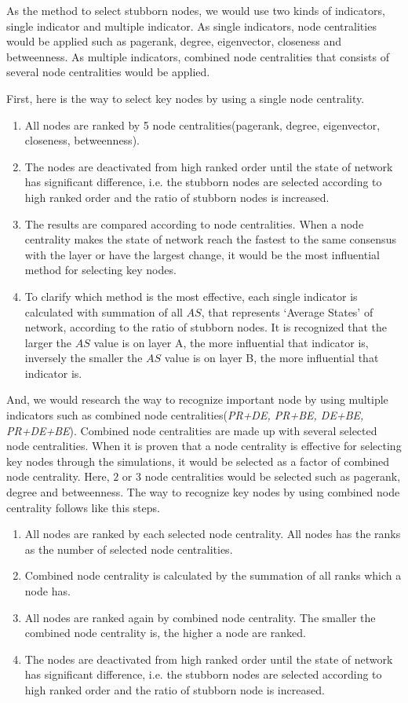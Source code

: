 As the method to select stubborn nodes, we would use two kinds of indicators, single indicator and multiple indicator. As single indicators, node centralities would be applied such as pagerank, degree, eigenvector, closeness and betweenness. As multiple indicators, combined node centralities that consists of several node centralities would be applied.
  
First, here is the way to select key nodes by using a single node centrality.
\begin{enumerate}
	\item All nodes are ranked by 5 node centralities(pagerank, degree, eigenvector, closeness, betweenness).
	\item The nodes are deactivated from high ranked order until the state of network has significant difference, i.e. the stubborn nodes are selected according to high ranked order and the ratio of stubborn nodes is increased. 
	\item The results are compared according to node centralities. When a node centrality makes the state of network reach the fastest to the same consensus with the layer or have the largest change, it would be the most influential method for selecting key nodes.
	\item To clarify which method is the most effective, each single indicator is calculated with summation of all $AS$, that represents `Average States' of network, according to the ratio of stubborn nodes. It is recognized that the larger the $AS$ value is on layer A, the more influential that indicator is, inversely the smaller the $AS$ value is on layer B, the more influential that indicator is.
	
\end{enumerate}
And, we would research the way to recognize important node by using multiple indicators such as combined node centralities(\textit{PR+DE, PR+BE, DE+BE, PR+DE+BE}). Combined node centralities are made up with several selected node centralities. When it is proven that a node centrality is effective for selecting key nodes through the simulations, it would be selected as a factor of combined node centrality. Here, $2$ or $3$ node centralities would be selected such as pagerank, degree and betweenness. 
The way to recognize key nodes by using combined node centrality follows like this steps. 
\begin{enumerate}
	\item All nodes are ranked by each selected node centrality. All nodes has the ranks as the number of selected node centralities.  
	\item Combined node centrality is calculated by the summation of all ranks which a node has. 
	\item All nodes are ranked again by combined node centrality. The smaller the combined node centrality is, the higher a node are ranked.        
	\item The nodes are deactivated from high ranked order until the state of network has significant difference, i.e. the stubborn nodes are selected according to high ranked order and the ratio of stubborn node is increased. 
\end{enumerate}

